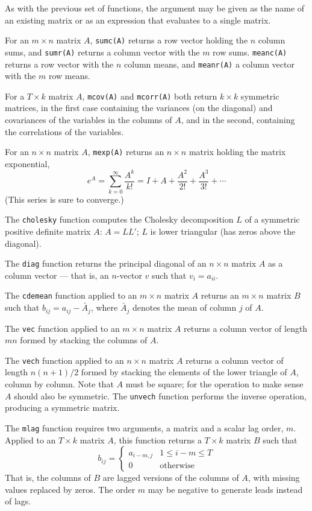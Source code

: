 As with the previous set of functions, the argument may be given as
the name of an existing matrix or as an expression that evaluates to a
single matrix.

For an $m \times n$ matrix $A$, \texttt{sumc(A)} returns a row vector
holding the $n$ column sums, and \texttt{sumr(A)} returns a column
vector with the $m$ row sums.  \texttt{meanc(A)} returns a row vector
with the $n$ column means, and \texttt{meanr(A)} a column vector with
the $m$ row means.

For a $T \times k$ matrix $A$, \texttt{mcov(A)} and \texttt{mcorr(A)}
both return $k \times k$ symmetric matrices, in the first case
containing the variances (on the diagonal) and covariances of the
variables in the columns of $A$, and in the second, containing the
correlations of the variables.

For an $n \times n$ matrix $A$, \texttt{mexp(A)} returns an $n \times
n$ matrix holding the matrix exponential,
\[
e^A = \sum_{k=0}^{\infty} \frac{A^k}{k!} = I + A + \frac{A^2}{2!} 
 + \frac{A^3}{3!} + \cdots
\]
(This series is sure to converge.)

The \texttt{cholesky} function computes the Cholesky decomposition $L$
of a symmetric positive definite matrix $A$: $A = LL'$; $L$ is lower
triangular (has zeros above the diagonal).  

The \texttt{diag} function returns the principal diagonal of an
$n\times n$ matrix $A$ as a column vector --- that is, an
$n$-vector $v$ such that $v_i = a_{ii}$.

The \texttt{cdemean} function applied to an $m \times n$ matrix $A$
returns an $m \times n$ matrix $B$ such that $b_{ij} = a_{ij} -
\bar{A}_j$, where $\bar{A}_j$ denotes the mean of column $j$ of $A$.  

The \texttt{vec} function applied to an $m \times n$ matrix $A$
returns a column vector of length $mn$ formed by stacking the columns
of $A$.  

The \texttt{vech} function applied to an $n \times n$ matrix $A$
returns a column vector of length $n(n+1)/2$ formed by stacking the
elements of the lower triangle of $A$, column by column.  Note that
$A$ must be square; for the operation to make sense $A$ should also
be symmetric.  The \texttt{unvech} function performs the inverse
operation, producing a symmetric matrix.

The \texttt{mlag} function requires two arguments, a matrix and a
scalar lag order, $m$.  Applied to an $T \times k$ matrix $A$, this
function returns a $T \times k$ matrix $B$ such that
%
\[
  b_{ij} = \left\{ 
    \begin{array}{ll} 
      a_{i-m,j} & 1 \leq i - m \leq T \\ 
      0 & \mbox{otherwise}
    \end{array}
    \right.
\]
%
That is, the columns of $B$ are lagged versions of the columns of $A$,
with missing values replaced by zeros.  The order $m$ may be negative
to generate leads instead of lags.

